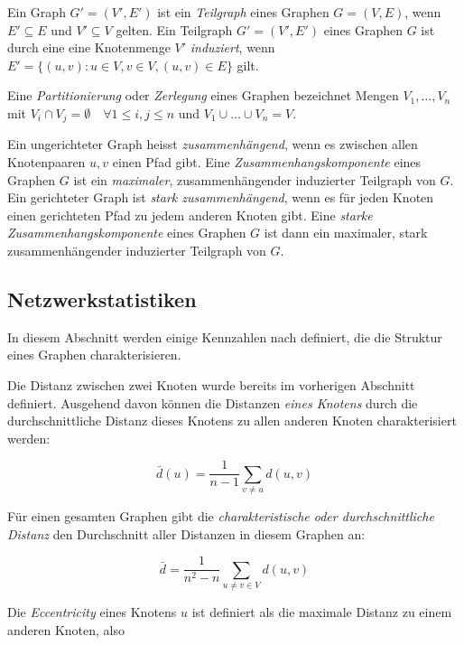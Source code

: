 Ein Graph $G' = (V', E')$ ist ein \emph{Teilgraph} eines Graphen $G =
(V, E)$, wenn $E' \subseteq E$ und $V' \subseteq V$ gelten. Ein
Teilgraph $G' = (V', E')$ eines Graphen $G$ ist durch eine eine
Knotenmenge $V'$ \emph{induziert}, wenn $E' = \{(u, v) : u \in V, v
\in V, (u, v) \in E\}$ gilt.

Eine \emph{Partitionierung} oder \emph{Zerlegung} eines Graphen
bezeichnet Mengen $V_1, \dots, V_n$ mit $V_i \cap V_j = \emptyset
\quad \forall 1 \le i, j \le n$ und $V_1 \cup \dots \cup V_n = V$.

Ein ungerichteter Graph heisst \emph{zusammenh\"angend}, wenn es
zwischen allen Knotenpaaren $u, v$ einen Pfad gibt. Eine
\emph{Zusammenhangskomponente} eines Graphen $G$ ist ein
\emph{maximaler}, zusammenh\"angender induzierter Teilgraph von
$G$. Ein gerichteter Graph ist \emph{stark zusammenh\"angend}, wenn es
f\"ur jeden Knoten einen gerichteten Pfad zu jedem anderen Knoten gibt. Eine
\emph{starke Zusammenhangskomponente} eines Graphen $G$ ist dann ein
maximaler, stark zusammenh\"angender induzierter Teilgraph von $G$.

\subsection{Netzwerkstatistiken}
\label{ch:Grundlagen:sec:Netzwerkanalyse:subsec:Statistiken}

In diesem Abschnitt werden einige Kennzahlen nach
\cite{Brinkmeier2004} definiert, die die Struktur eines Graphen
charakterisieren.

Die Distanz zwischen zwei Knoten wurde bereits im vorherigen Abschnitt
definiert. Ausgehend davon k\"onnen die Distanzen \emph{eines Knotens}
durch die durchschnittliche Distanz dieses Knotens zu allen anderen
Knoten charakterisiert werden:

\begin{equation}
  \label{eq:1}
  \bar{d}(u) = \frac{1}{n-1} \sum_{v \ne u} d(u, v)
\end{equation}

F\"ur einen gesamten Graphen gibt die \emph{charakteristische oder
  durchschnittliche Distanz} den Durchschnitt aller Distanzen in
diesem Graphen an:

\begin{equation}
  \label{eq:2}
  \bar{d} = \frac{1}{n^2 - n} \sum_{u \ne v \in V} d(u, v)
\end{equation}

Die \emph{Eccentricity} eines Knotens $u$ ist definiert als die
maximale Distanz zu einem anderen Knoten, also

